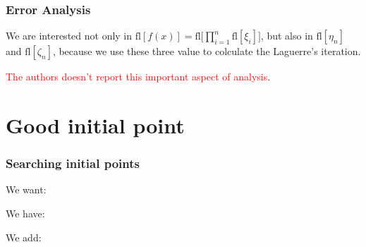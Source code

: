 \documentclass{beamer}
\theoremstyle{definition} \newtheorem{de}{Def}
\theoremstyle{remark} \newtheorem{os}[de]{Remark}
\theoremstyle{plain} \newtheorem{te}[de]{Teo}
\theoremstyle{plain} \newtheorem{co}[de]{Cor}
\theoremstyle{plain} \newtheorem{pr}[de]{Prop}
\theoremstyle{plain} \newtheorem{lem}[de]{Lemm}
\theoremstyle{remark} \newtheorem{rem}[de]{Remark}
\begin{document}
\begin{frame}
  \frametitle{Error Analysis}

We are interested not only in $\text{fl}[f(x)]=\text{fl}\Big[ \prod_{i=1}^n \text{fl}[\xi_i]  \Big]$, but also in $\text{fl}[\eta_n]$ and $\text{fl}[\zeta_n]$, because we use these three value to colculate the Laguerre's iteration.

\pause

\textcolor{red}{The authors doesn't report this important aspect of analysis}.

\pause



\end{frame}

\section{Good initial point}

\begin{frame}
\frametitle{Searching initial points}

\begin{Bdescription}
  \item [We want:]
  
  \item [We have:]

  \item [We add:]
\end{Bdescription}
\end{frame}
\end{document}
